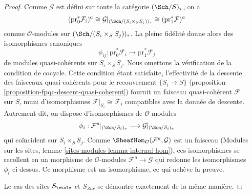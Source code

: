 \begin{proof}
\medskip\noindent
Comme $\mathcal{G}$ est défini sur toute la catégorie $(\Sch/S)_\tau$,
on a
$$
(\text{pr}_0^*\mathcal{F}_i)^a
\cong
\mathcal{G}|_{(\Sch/(S_i \times_S S_j))_\tau}
\cong
(\text{pr}_1^*\mathcal{F})^a
$$
comme $\mathcal{O}$-modules sur $(\Sch/(S_i \times_S S_j))_\tau$.
La pleine fidélité donne alors des isomorphismes canoniques
$$
\phi_{ij} :
\text{pr}_0^*\mathcal{F}_i
\longrightarrow
\text{pr}_1^*\mathcal{F}_j
$$
de modules quasi-cohérents sur $S_i \times_S S_j$. Nous omettons la
vérification de la condition de cocycle. Cette condition étant satisfaite,
l'effectivité de la descente des faisceaux quasi-cohérents pour le
recouvrement $\{S_i \to S\}$ (proposition
\ref{proposition-fpqc-descent-quasi-coherent}) fournit un faisceau
quasi-cohérent $\mathcal{F}$ sur $S$, muni d'isomorphismes
$\mathcal{F}|_{S_i} \cong \mathcal{F}_i$ compatibles avec la donnée de
descente. Autrement dit, on dispose d'isomorphismes de
$\mathcal{O}$-modules
$$
\phi_i :
\mathcal{F}^a|_{(\Sch/S_i)_\tau}
\longrightarrow
\mathcal{G}|_{(\Sch/S_i)_\tau}
$$
qui coïncident sur $S_i \times_S S_j$. Comme
$\SheafHom_\mathcal{O}(\mathcal{F}^a, \mathcal{G})$ est un faisceau
(Modules sur les sites, lemme \ref{sites-modules-lemma-internal-hom}),
ces isomorphismes se recollent en un morphisme de $\mathcal{O}$-modules
$\mathcal{F}^a \to \mathcal{G}$ qui redonne les isomorphismes $\phi_i$
ci-dessus. Ce morphisme est un isomorphisme, ce qui
achève la preuve.

\medskip\noindent
Le cas des sites $S_\etale$ et $S_{Zar}$ se démontre exactement de la
même manière.
\end{proof}

